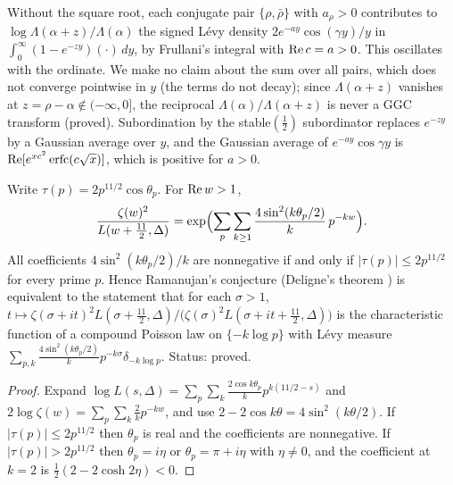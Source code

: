 \begin{remark}\label{dl:rem:sqrt}
Without the square root, each conjugate pair $\{\rho,\bar\rho\}$ with $a_\rho>0$ contributes to $\log\Lambda(\alpha+z)/\Lambda(\alpha)$ the signed L\'evy density $2e^{-ay}\cos(\gamma y)/y$ in $\int_0^\infty(1-e^{-zy})(\cdot)\,dy$, by Frullani's integral with $\operatorname{Re} c=a>0$. This oscillates with the ordinate. We make no claim about the sum over all pairs, which does not converge pointwise in $y$ (the terms do not decay); since $\Lambda(\alpha+z)$ vanishes at $z=\rho-\alpha\notin(-\infty,0]$, the reciprocal $\Lambda(\alpha)/\Lambda(\alpha+z)$ is never a GGC transform (proved). Subordination by the stable$(\frac12)$ subordinator replaces $e^{-zy}$ by a Gaussian average over $y$, and the Gaussian average of $e^{-ay}\cos\gamma y$ is $\operatorname{Re}[e^{xc^2}\operatorname{erfc}(c\sqrt x)]$, which is positive for $a>0$.
\end{remark}

\begin{proposition}\label{dl:prop:deligne}
Write $\tau(p)=2p^{11/2}\cos\theta_p$. For $\operatorname{Re} w>1$,
\[
\frac{\zeta(w)^2}{L(w+\frac{11}2,\Delta)}=\exp\Bigl(\sum_p\sum_{k\ge1}\frac{4\sin^2(k\theta_p/2)}{k}\,p^{-kw}\Bigr).
\]
All coefficients $4\sin^2(k\theta_p/2)/k$ are nonnegative if and only if $|\tau(p)|\le2p^{11/2}$ for every prime $p$. Hence Ramanujan's conjecture (Deligne's theorem \cite{Deligne74}) is equivalent to the statement that for each $\sigma>1$, $t\mapsto\zeta(\sigma+it)^2L(\sigma+\frac{11}2,\Delta)/\bigl(\zeta(\sigma)^2L(\sigma+it+\frac{11}2,\Delta)\bigr)$ is the characteristic function of a compound Poisson law on $\{-k\log p\}$ with L\'evy measure $\sum_{p,k}\frac{4\sin^2(k\theta_p/2)}{k}p^{-k\sigma}\delta_{-k\log p}$. Status: proved.
\end{proposition}

\begin{proof}
Expand $\log L(s,\Delta)=\sum_p\sum_k\frac{2\cos k\theta_p}kp^{k(11/2-s)}$ and $2\log\zeta(w)=\sum_p\sum_k\frac2kp^{-kw}$, and use $2-2\cos k\theta=4\sin^2(k\theta/2)$. If $|\tau(p)|\le2p^{11/2}$ then $\theta_p$ is real and the coefficients are nonnegative. If $|\tau(p)|>2p^{11/2}$ then $\theta_p=i\eta$ or $\theta_p=\pi+i\eta$ with $\eta\ne0$, and the coefficient at $k=2$ is $\frac12(2-2\cosh2\eta)<0$.
\end{proof}

